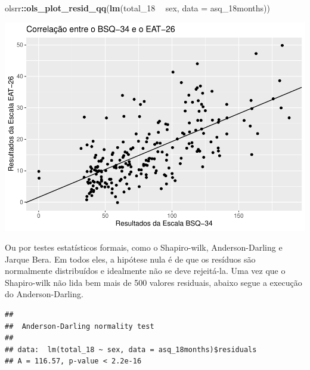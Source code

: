 \documentclass[
]{book}
\newenvironment{Shaded}{\begin{snugshade}}{\end{snugshade}}
\newcommand{\DataTypeTok}[1]{\textcolor[rgb]{0.13,0.29,0.53}{#1}}
\newcommand{\DecValTok}[1]{\textcolor[rgb]{0.00,0.00,0.81}{#1}}
\newcommand{\KeywordTok}[1]{\textcolor[rgb]{0.13,0.29,0.53}{\textbf{#1}}}
\newcommand{\NormalTok}[1]{#1}
\newcommand{\OperatorTok}[1]{\textcolor[rgb]{0.81,0.36,0.00}{\textbf{#1}}}
\newcommand{\StringTok}[1]{\textcolor[rgb]{0.31,0.60,0.02}{#1}}
\begin{document}
\begin{Shaded}
\begin{Highlighting}[]
\NormalTok{olsrr}\OperatorTok{::}\KeywordTok{ols_plot_resid_qq}\NormalTok{(}\KeywordTok{lm}\NormalTok{(total_}\DecValTok{18} \OperatorTok{~}\StringTok{ }\NormalTok{sex, }\DataTypeTok{data =}\NormalTok{ asq_18months))}
\end{Highlighting}
\end{Shaded}

\begin{center}\includegraphics{gitbook-demo_files/figure-latex/unnamed-chunk-82-1} \end{center}

Ou por testes estatísticos formais, como o Shapiro-wilk,
Anderson-Darling e Jarque Bera. Em todos eles, a hipótese nula é de que
os resíduos são normalmente distribuídos e idealmente não se deve
rejeitá-la. Uma vez que o Shapiro-wilk não lida bem mais de 500 valores
residuais, abaixo segue a execução do Anderson-Darling.

\begin{Shaded}
\end{Shaded}

\begin{verbatim}
## 
##  Anderson-Darling normality test
## 
## data:  lm(total_18 ~ sex, data = asq_18months)$residuals
## A = 116.57, p-value < 2.2e-16
\end{verbatim}
\end{document}
